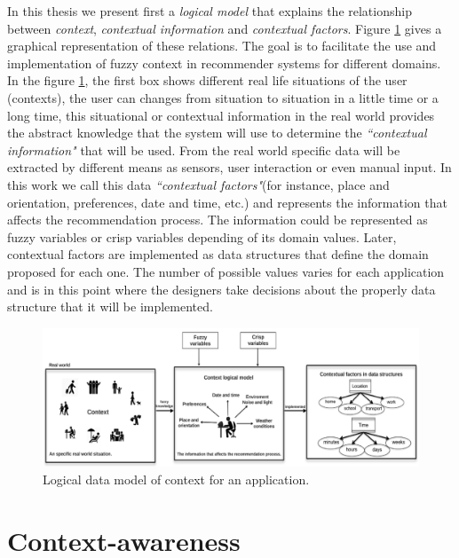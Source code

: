In this thesis we present first a \textit{logical model} that explains 
the relationship between \textit{context},
\textit{contextual information} and \textit{contextual factors}. Figure \ref{fig:logicalmodel} 
gives a graphical representation of these relations. 
The goal is to facilitate the use and
implementation of fuzzy context in recommender systems for different domains.\\
In the figure \ref{fig:logicalmodel}, the first box shows different
real life situations of the user (contexts), the user can changes from situation
to situation in a little time or a long time, this situational or
contextual information in the real world provides the abstract knowledge that
the system will use to determine the \textit{``contextual information"} that will be used. 
From the real world specific data will be extracted by different means as
sensors, user interaction or even manual input. In this work 
we call this data \textit{``contextual factors"}(for instance, place and
orientation, preferences, date and time, etc.) and represents the
information that affects the recommendation process. The information
could be represented as fuzzy variables or crisp variables depending of
its domain values. Later, contextual factors are implemented as data
structures that define the domain proposed for each one. The number of
possible values varies for each application and is in this point where
the designers take decisions about the properly data structure  that
it will be implemented.
\begin{figure}
\captionsetup{font=footnotesize} \centering
\includegraphics[width=1.0\textwidth]{img/context-scheme.png}  
\small
\caption{Logical data model of context for an application.}
\label{fig:logicalmodel}    
\end{figure} %

\section{Context-awareness} \label{context-awareness}

